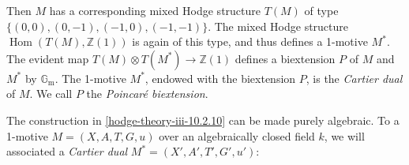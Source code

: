     Then \(M\) has a corresponding mixed Hodge structure \(T(M)\) of type \(\{(0,0),(0,-1),(-1,0),(-1,-1)\}\).
    The mixed Hodge structure \(\operatorname {Hom}(T(M),\mathbb {Z}(1))\) is again of this type, and thus defines a 1-motive \(M^*\).
    The evident map \(T(M)\otimes  T(M^*)\to \mathbb {Z}(1)\) defines a biextension \(P\) of \(M\) and \(M^*\) by \(\mathbb {G}_\mathrm {m}\).
    The 1-motive \(M^*\), endowed with the biextension \(P\), is the \emph{Cartier dual} of \(M\).
    We call \(P\) the \emph{Poincaré biextension}.\label{hodge-theory-iii-10.2.11}\par{}The construction in \cref{hodge-theory-iii-10.2.10} can be made purely algebraic.
    To a 1-motive \(M=(X,A,T,G,u)\) over an algebraically closed field \(k\), we will associated a \emph{Cartier dual} \(M^*=(X',A',T',G',u')\):

